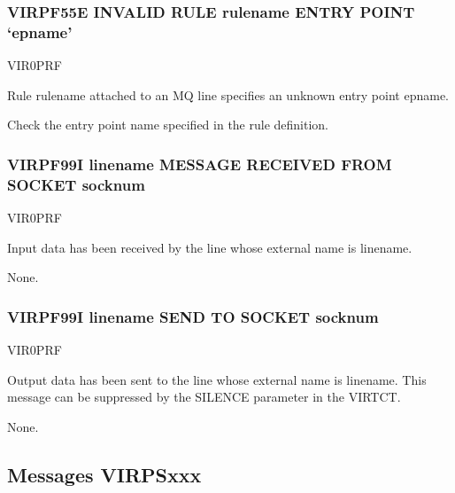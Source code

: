 \documentclass[letterpaper,10pt,english]{sphinxmanual}
\begin{document}
\subsubsection{VIRPF55E INVALID RULE rulename ENTRY POINT ‘epname’}
\label{\detokenize{messages:virpf55e-invalid-rule-rulename-entry-point-epname}}\begin{description}
\sphinxAtStartPar
VIR0PRF

\sphinxAtStartPar
Rule rulename attached to an MQ line specifies an unknown entry point epname.

\sphinxAtStartPar
Check the entry point name specified in the rule definition.

\end{description}


\subsubsection{VIRPF99I linename MESSAGE RECEIVED FROM SOCKET socknum}
\label{\detokenize{messages:virpf99i-linename-message-received-from-socket-socknum}}\begin{description}
\sphinxAtStartPar
VIR0PRF

\sphinxAtStartPar
Input data has been received by the line whose external name is linename.

\sphinxAtStartPar
None.

\end{description}


\subsubsection{VIRPF99I linename SEND TO SOCKET socknum}
\label{\detokenize{messages:virpf99i-linename-send-to-socket-socknum}}\begin{description}
\sphinxAtStartPar
VIR0PRF

\sphinxAtStartPar
Output data has been sent to the line whose external name is linename. This message can be suppressed by the SILENCE parameter in the VIRTCT.

\sphinxAtStartPar
None.

\end{description}


\subsection{Messages VIRPSxxx}
\label{\detokenize{messages:messages-virpsxxx}}
\end{document}
